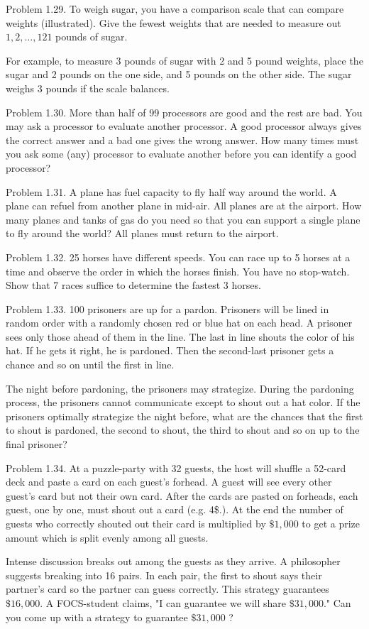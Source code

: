 \documentclass[10pt]{article}
\begin{document}
Problem 1.29. To weigh sugar, you have a comparison scale that can compare weights (illustrated). Give the fewest weights that are needed to measure out $1,2, \ldots, 121$ pounds of sugar.

For example, to measure 3 pounds of sugar with 2 and 5 pound weights, place the sugar and 2 pounds on the one side, and 5 pounds on the other side. The sugar weighs 3 pounds if the scale balances.


Problem 1.30. More than half of 99 processors are good and the rest are bad. You may ask a processor to evaluate another processor. A good processor always gives the correct answer and a bad one gives the wrong answer. How many times must you ask some (any) processor to evaluate another before you can identify a good processor?


Problem 1.31. A plane has fuel capacity to fly half way around the world. A plane can refuel from another plane in mid-air. All planes are at the airport. How many planes and tanks of gas do you need so that you can support a single plane to fly around the world? All planes must return to the airport.

Problem 1.32. 25 horses have different speeds. You can race up to 5 horses at a time and observe the order in which the horses finish. You have no stop-watch. Show that 7 races suffice to determine the fastest 3 horses.

Problem 1.33. 100 prisoners are up for a pardon. Prisoners will be lined in random order with a randomly chosen red or blue hat on each head. A prisoner sees only those ahead of them in the line. The last in line shouts the color of his hat. If he gets it right, he is pardoned. Then the second-last prisoner gets a chance and so on until the first in line.

The night before pardoning, the prisoners may strategize. During the pardoning process, the prisoners cannot communicate except to shout out a hat color. If the prisoners optimally strategize the night before, what are the chances that the first to shout is pardoned, the second to shout, the third to shout and so on up to the final prisoner?

Problem 1.34. At a puzzle-party with 32 guests, the host will shuffle a 52-card deck and paste a card on each guest's forhead. A guest will see every other guest's card but not their own card. After the cards are pasted on forheads, each guest, one by one, must shout out a card (e.g. 4\$.). At the end the number of guests who correctly shouted out their card is multiplied by $\$ 1,000$ to get a prize amount which is split evenly among all guests.

Intense discussion breaks out among the guests as they arrive. A philosopher suggests breaking into 16 pairs. In each pair, the first to shout says their partner's card so the partner can guess correctly. This strategy guarantees $\$ 16,000$. A FOCS-student claims, "I can guarantee we will share $\$ 31,000$." Can you come up with a strategy to guarantee $\$ 31,000$ ?
\end{document}
